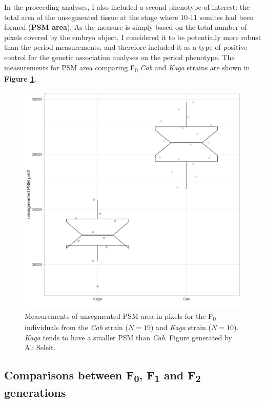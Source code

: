 \documentclass[
]{book}
\begin{document}
In the proceeding analyses, I also included a second phenotype of interest: the total area of the unsegmented tissue at the stage where 10-11 somites had been formed (\textbf{PSM area}). As the measure is simply based on the total number of pixels covered by the embryo object, I considered it to be potentially more robust than the period measurements, and therefore included it as a type of positive control for the genetic association analyses on the period phenotype. The measurements for PSM area comparing F\textsubscript{0} \emph{Cab} and \emph{Kaga} strains are shown in \textbf{Figure \ref{fig:ali-psm-F0}}.



\begin{figure}

{\centering \includegraphics[width=0.6\linewidth]{figs/somites/ali_PSM_Cab_Kaga} 

}

\caption{Measurements of unsegmented PSM area in pixels for the F\textsubscript{0} individuals from the \emph{Cab} strain (\(N = 19\)) and \emph{Kaga} strain (\(N = 10\)). \emph{Kaga} tends to have a smaller PSM than \emph{Cab}. Figure generated by Ali Seleit.}\label{fig:ali-psm-F0}
\end{figure}

\clearpage

\hypertarget{comparisons-between-f0-f1-and-f2-generations}{%
\subsection{\texorpdfstring{Comparisons between F\textsubscript{0}, F\textsubscript{1} and F\textsubscript{2} generations}{Comparisons between F0, F1 and F2 generations}}\label{comparisons-between-f0-f1-and-f2-generations}}
\end{document}
